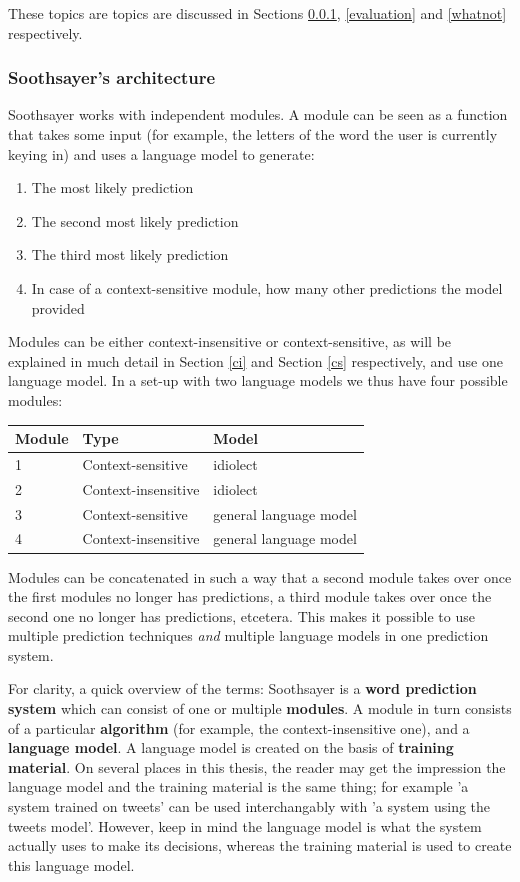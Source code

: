 \documentclass[11pt]{article}
\let\originaltable\table
\let\endoriginaltable\endtable
\renewenvironment{table}[1][ht]{%
  \originaltable[#1]
  \centering}%
  {\endoriginaltable}
\begin{document}
These topics are topics are discussed in Sections \ref{ss_intro}, \ref{evaluation} and \ref{whatnot} respectively.

\subsubsection{Soothsayer's architecture} \label{ss_intro}
Soothsayer works with independent modules. A module can be seen as a function that takes some input (for example, the letters of the word the user is currently keying in) and uses a language model to generate:

\begin{enumerate}
\item The most likely prediction
\item The second most likely prediction
\item The third most likely prediction
\item In case of a context-sensitive module, how many other predictions the model provided
\end{enumerate}

Modules can be either context-insensitive or context-sensitive, as will be explained in much detail in Section \ref{ci} and Section \ref{cs} respectively, and use one language model. In a set-up with two language models we thus have four possible modules:

\begin{table}[h]
\begin{tabular}{lll} 
Module&Type&Model\\
\hline
1&Context-sensitive&idiolect\\
2&Context-insensitive&idiolect\\
3&Context-sensitive&general language model\\
4&Context-insensitive&general language model\\
\end{tabular} 
\caption{A possible module set-up for Soothsayer}
\end{table}

Modules can be concatenated in such a way that a second module takes over once the first modules no longer has predictions, a third module takes over once the second one no longer has predictions, etcetera. This makes it possible to use multiple prediction techniques \emph{and} multiple language models in one prediction system.

For clarity, a quick overview of the terms: Soothsayer is a \textbf{word prediction system} which can consist of one or multiple \textbf{modules}. A module in turn consists of a particular \textbf{algorithm} (for example, the context-insensitive one), and a \textbf{language model}. A language model is created on the basis of \textbf{training material}. On several places in this thesis, the reader may get the impression the language model and the training material is the same thing; for example 'a system trained on tweets' can be used interchangably with 'a system using the tweets model'. However, keep in mind the language model is what the system actually uses to make its decisions, whereas the training material is used to create this language model.
\end{document}
